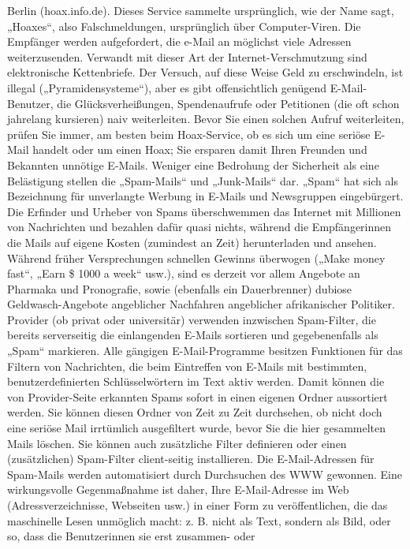 \documentclass[]{book}
\theoremstyle{definition}
\theoremstyle{definition}
\theoremstyle{definition}
\theoremstyle{remark}
\begin{document}
Berlin (hoax.info.de). Dieses Service sammelte ursprünglich, wie der
Name sagt, „Hoaxes``, also Falschmeldungen, ursprünglich über
Computer-Viren. Die Empfänger werden aufgefordert, die e-Mail an
möglichst viele Adressen weiterzusenden. Verwandt mit dieser Art der
Internet-Verschmutzung sind elektronische Kettenbriefe. Der Versuch, auf
diese Weise Geld zu erschwindeln, ist illegal („Pyramidensysteme``),
aber es gibt offensichtlich genügend E-Mail-Benutzer, die
Glücksverheißungen, Spendenaufrufe oder Petitionen (die oft schon
jahrelang kursieren) naiv weiterleiten. Bevor Sie einen solchen Aufruf
weiterleiten, prüfen Sie immer, am besten beim Hoax-Service, ob es sich
um eine seriöse E-Mail handelt oder um einen Hoax; Sie ersparen damit
Ihren Freunden und Bekannten unnötige E-Mails. Weniger eine Bedrohung
der Sicherheit als eine Belästigung stellen die „Spam-Mails`` und
„Junk-Mails`` dar. „Spam`` hat sich als Bezeichnung für unverlangte
Werbung in E-Mails und Newsgruppen eingebürgert. Die Erfinder und
Urheber von Spams überschwemmen das Internet mit Millionen von
Nachrichten und bezahlen dafür quasi nichts, während die Empfängerinnen
die Mails auf eigene Kosten (zumindest an Zeit) herunterladen und
ansehen. Während früher Versprechungen schnellen Gewinns überwogen
(„Make money fast``, „Earn \$ 1000 a week`` usw.), sind es derzeit vor
allem Angebote an Pharmaka und Pronografie, sowie (ebenfalls ein
Dauerbrenner) dubiose Geldwasch-Angebote angeblicher Nachfahren
angeblicher afrikanischer Politiker. Provider (ob privat oder
universitär) verwenden inzwischen Spam-Filter, die bereits serverseitig
die einlangenden E-Mails sortieren und gegebenenfalls als „Spam``
markieren. Alle gängigen E-Mail-Programme besitzen Funktionen für das
Filtern von Nachrichten, die beim Eintreffen von E-Mails mit bestimmten,
benutzerdefinierten Schlüsselwörtern im Text aktiv werden. Damit können
die von Provider-Seite erkannten Spams sofort in einen eigenen Ordner
aussortiert werden. Sie können diesen Ordner von Zeit zu Zeit
durchsehen, ob nicht doch eine seriöse Mail irrtümlich ausgefiltert
wurde, bevor Sie die hier gesammelten Mails löschen. Sie können auch
zusätzliche Filter definieren oder einen (zusätzlichen) Spam-Filter
client-seitig installieren. Die E-Mail-Adressen für Spam-Mails werden
automatisiert durch Durchsuchen des WWW gewonnen. Eine wirkungsvolle
Gegenmaßnahme ist daher, Ihre E-Mail-Adresse im Web
(Adressverzeichnisse, Webseiten usw.) in einer Form zu veröffentlichen,
die das maschinelle Lesen unmöglich macht: z. B. nicht als Text, sondern
als Bild, oder so, dass die Benutzerinnen sie erst zusammen- oder
\end{document}
